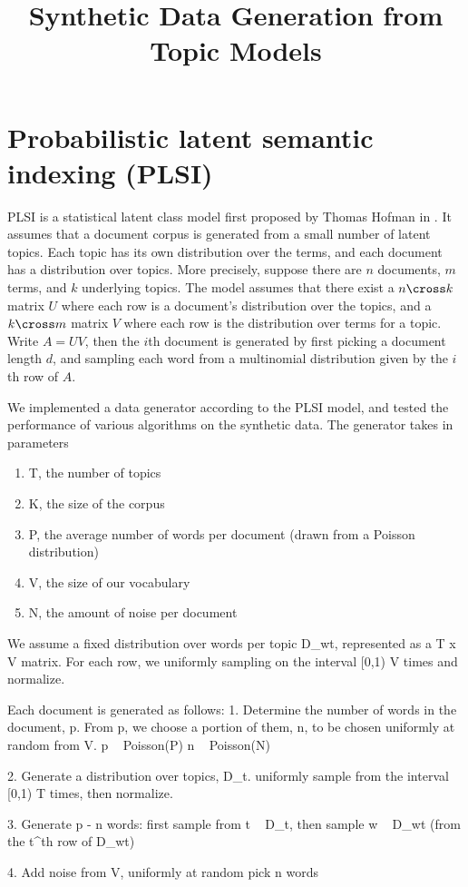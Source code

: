 \documentclass[11pt]{article}
\title{Synthetic Data Generation from Topic Models }
\author{}
\date{}                                           %
\theoremstyle{definition}
\begin{document}
\maketitle
\section{Probabilistic latent semantic indexing (PLSI)}
PLSI is a statistical latent class model first proposed by Thomas Hofman in \cite{?}. It assumes that a document corpus is generated from a small number of latent topics. Each topic has its own distribution over the terms, and each document has a distribution over topics. More precisely, suppose there are $n$ documents, $m$ terms, and $k$ underlying topics. The model assumes that there exist a $n\cross k$ matrix $U$ where each row is a document's distribution over the topics, and a $k\cross m$ matrix $V$ where each row is the distribution over terms for a topic. Write $A=UV$, then the $i$th document is generated by first picking a document length $d$, and sampling each word from a multinomial distribution given by the $i$th row of $A$. 

We implemented a data generator according to the PLSI model, and tested the performance of various algorithms on the synthetic data. The generator takes in parameters
\begin{enumerate}
	\item T, the number of topics
	\item K, the size of the corpus
	\item P, the average number of words per document (drawn from a Poisson distribution)
	\item V, the size of our vocabulary
	\item N, the amount of noise per document
\end{enumerate}

We assume a fixed distribution over words per topic D_wt, represented as a T x V matrix. For each row, we uniformly sampling on the interval [0,1) V times and normalize.

Each document is generated as follows:
1. Determine the number of words in the document, p. From p, we choose a portion of them, n, to be chosen uniformly at random from V.
p ~ Poisson(P)
n ~ Poisson(N)

2. Generate a distribution over topics, D_t.
uniformly sample from the interval [0,1) T times, then normalize.

3. Generate p - n words:
first sample from t ~ D_t, then sample w ~ D_wt (from the t^th row of D_wt)

4. Add noise
from V, uniformly at random pick n words 
\end{document}
